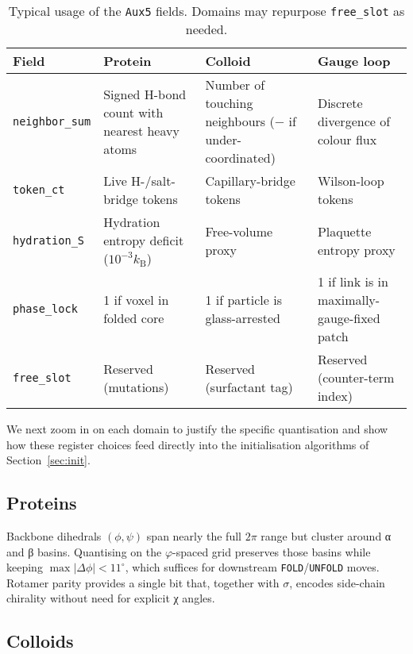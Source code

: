 \documentclass[11pt,a4paper]{article}
\begin{document}
\begin{table}[htbp]
\centering
\caption{Typical usage of the \texttt{Aux5} fields.  Domains may repurpose
\texttt{free\_slot} as needed.}
\label{tab:aux5-mapping}
\renewcommand{\arraystretch}{1.2}
\begin{tabular}{@{} l | p{3.5cm} | p{3.5cm} | p{3.5cm} @{}}
\toprule
\textbf{Field} &
\textbf{Protein} &
\textbf{Colloid} &
\textbf{Gauge loop} \\
\midrule
\texttt{neighbor\_sum} &
Signed H-bond count with nearest heavy atoms &
Number of touching neighbours ($−$ if under-coordinated) &
Discrete divergence of colour flux \\[0.2em]
\texttt{token\_ct} &
Live H-/salt-bridge tokens &
Capillary-bridge tokens &
Wilson-loop tokens \\[0.2em]
\texttt{hydration\_S} &
Hydration entropy deficit ($10^{-3}k_{\mathrm B}$) &
Free-volume proxy &
Plaquette entropy proxy \\[0.2em]
\texttt{phase\_lock} &
1 if voxel in folded core &
1 if particle is glass-arrested &
1 if link is in maximally-gauge-fixed patch \\[0.2em]
\texttt{free\_slot} &
Reserved (mutations) &
Reserved (surfactant tag) &
Reserved (counter-term index) \\
\bottomrule
\end{tabular}
\end{table}

\bigskip
We next zoom in on each domain to justify the specific quantisation and
show how these register choices feed directly into the initialisation
algorithms of Section~\ref{sec:init}.

\subsection{Proteins}
\label{subsec:table-protein}

Backbone dihedrals $(\phi,\psi)$ span nearly the full $2\pi$ range but
cluster around α and β basins.  Quantising on the
$\varphi$-spaced grid preserves those basins while keeping
$\max|\Delta\phi|<11^{\circ}$, which suffices for downstream
\texttt{FOLD}/\texttt{UNFOLD} moves.  Rotamer parity provides a single
bit that, together with $\sigma$, encodes side-chain chirality without
need for explicit χ angles.

\subsection{Colloids}
\label{subsec:table-colloid}
\end{document}
